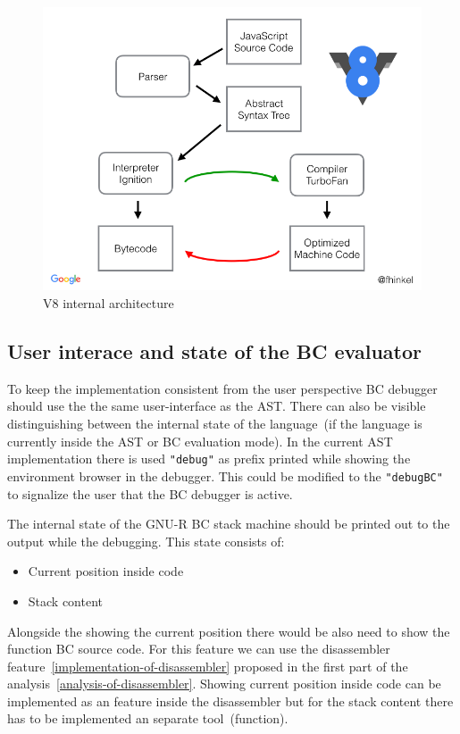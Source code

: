 \documentclass[thesis=M,english]{FITthesis}[2018/10/20]
\newcommand{\code}[1]{\texttt{#1}}
\begin{document}
\begin{figure}[!h]\centering
	\includegraphics[width=\textwidth]{v8-architecture}
	\caption{V8 internal architecture}\label{fig:ast-v8-architecture}
\end{figure}

\subsection{User interace and state of the BC evaluator}\label{user-interface-and-state-of-the-bc-eval}

To keep the implementation consistent from the user perspective BC debugger should use the the same user-interface as the AST. There can also be visible distinguishing between the internal state of the language~(if the language is currently inside the AST or BC evaluation mode). In the current AST implementation there is used 
\code{"debug"} as prefix printed while showing the environment browser in the debugger. This could be modified to the \code{"debugBC"} to signalize the user that the BC debugger is active.

The internal state of the GNU-R BC stack machine should be printed out to the output while the debugging. This state consists of:

\begin{itemize}
	\item Current position inside code
	\item Stack content
\end{itemize}

Alongside the showing the current position there would be also need to show the function BC source code. For this feature we can use the disassembler feature~\ref{implementation-of-disassembler} proposed in the first part of the analysis~\ref{analysis-of-disassembler}. Showing current position inside code can be implemented as an feature inside the disassembler but for the stack content there has to be implemented an separate tool~(function).
\end{document}
